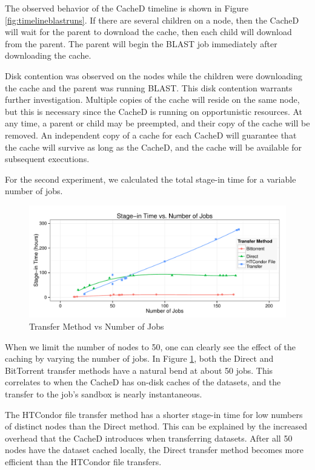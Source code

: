 The observed behavior of the CacheD timeline is shown in Figure \ref{fig:timelineblastruns}.  If there are several children on a node, then the CacheD will wait for the parent to download the cache, then each child will download from the parent.  The parent will begin the BLAST job immediately after downloading the cache.  

Disk contention was observed on the nodes while the children were downloading the cache and the parent was running BLAST.  This disk contention warrants further investigation.  Multiple copies of the cache will reside on the same node, but this is necessary since the CacheD is running on opportunistic resources.  At any time, a parent or child may be preempted, and their copy of the cache will be removed.  An independent copy of a cache for each CacheD will guarantee that the cache will survive as long as the CacheD, and the cache will be available for subsequent executions.

For the second experiment, we calculated the total stage-in time for a variable number of jobs.

\begin{figure}[h!t]
\centering
\includegraphics[width=\textwidth]{images/StageinPlot.pdf}
\caption{Transfer Method vs Number of Jobs}
\label{fig:methodvsnumjobs}
\end{figure}

When we limit the number of nodes to 50, one can clearly see the effect of the caching by varying the number of jobs.  In Figure \ref{fig:methodvsnumjobs}, both the Direct and BitTorrent transfer methods have a natural bend at about 50 jobs.  This correlates to when the CacheD has on-disk caches of the datasets, and the transfer to the job's sandbox is nearly instantaneous.  

The HTCondor file transfer method has a shorter stage-in time for low numbers of distinct nodes than the Direct method.  This can be explained by the increased overhead that the CacheD introduces when transferring datasets.  After all 50 nodes have the dataset cached locally, the Direct transfer method becomes more efficient than the HTCondor file transfers.

